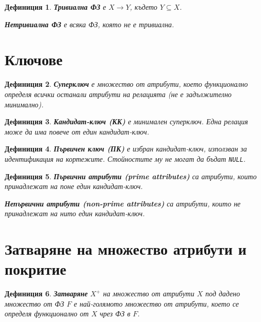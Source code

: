 \documentclass{scrartcl}
\newtheorem{definition}{Дефиниция}
\begin{document}
\begin{FlushLeft}
\begin{definition}
\textbf{\textit{Тривиална ФЗ}} е $X \rightarrow Y$, където $Y \subseteq X$.

\textbf{\textit{Нетривиална ФЗ}} е всяка ФЗ, която не е тривиална.
\end{definition}

\section{Ключове}

\begin{definition}
\textbf{\textit{Суперключ}} е множество от атрибути, което функционално определя всички останали атрибути на релацията (не е задължително минимално).
\end{definition}

\begin{definition}
\textbf{\textit{Кандидат-ключ (КК)}} е минимален суперключ. Една релация може да има повече от един кандидат-ключ.
\end{definition}

\begin{definition}
\textbf{\textit{Първичен ключ (ПК)}} е избран кандидат-ключ, използван за идентификация на кортежите. Стойностите му не могат да бъдат \texttt{NULL}.
\end{definition}

\begin{definition}
\textbf{\textit{Първични атрибути (prime attributes)}} са атрибути, които принадлежат на поне един кандидат-ключ.

\textbf{\textit{Непървични атрибути (non-prime attributes)}} са атрибути, които не принадлежат на нито един кандидат-ключ.
\end{definition}

\section{Затваряне на множество атрибути и покритие}

\begin{definition}
\textbf{\textit{Затваряне}} $X^+$ на множество от атрибути $X$ под дадено множество от ФЗ $F$ е най-голямото множество от атрибути, което се определя функционално от $X$ чрез ФЗ в $F$.
\end{definition}


\end{FlushLeft}
\end{document}
